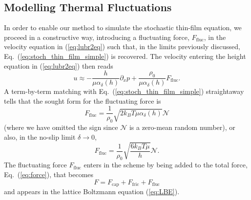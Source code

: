 \subsection{Modelling Thermal Fluctuations}\label{subsec:thermal_fluc_model}
In order to enable our method to simulate the stochastic thin-film equation, we proceed in a constructive way,
introducing a fluctuating force, $F_{\text{fluc}}$, in the velocity equation in (\ref{eq:lubr2eq}) such that, in the limits previously discussed, Eq.~(\ref{eq:stoch_thin_film_simple}) is recovered. The velocity entering the height equation in (\ref{eq:lubr2eq}) 
then reads
\begin{equation}
u \approx -\frac{h}{\mu \alpha_{\delta}(h)}\partial_x p + \frac{\rho_0}{\mu \alpha_{\delta}(h)}F_{\text{fluc}}.
\end{equation}
A term-by-term matching with Eq.~(\ref{eq:stoch_thin_film_simple}) straightaway tells that the sought form for the fluctuating force is
\begin{equation}
    F_{\text{fluc}} = \frac{1}{\rho_0} \sqrt{2 k_B T \mu \alpha_{\delta}(h)}\mathcal{N}
\end{equation}
(where we have omitted the sign since $\mathcal{N}$ is a zero-mean random number), or also, in the no-slip 
limit $\delta \rightarrow 0$, 
\begin{equation}\label{eq:thermal_force}
    F_{\text{fluc}} = \frac{1}{\rho_0}\sqrt{\frac{6k_BT\mu}{h}}\mathcal{N}.
\end{equation}
The fluctuating force $F_{\text{fluc}}$ enters in the scheme by being added to the total force, Eq.~(\ref{eq:force}), that becomes
\begin{equation}\label{eq:tot_force}
F = F_{\text{cap}} + F_{\text{fric}} + F_{\text{fluc}}
\end{equation}
and appears in the lattice Boltzmann equation (\ref{eq:LBE}).

